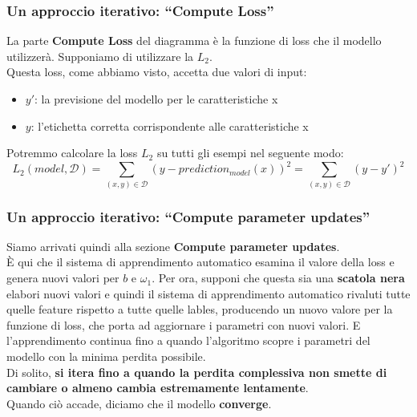 \begin{frame}

	\frametitle{Un approccio iterativo: {\color{GradientDescentDiagramRed}``Compute Loss''}}

		La parte \textbf{Compute Loss} del diagramma è la funzione di loss che il modello utilizzerà.
		\newlinedouble
		Supponiamo di utilizzare la $L_2$.\\
		Questa loss, come abbiamo visto, accetta due valori di input:
		\begin{itemize}
			\item $y'$: la previsione del modello per le caratteristiche x
			\item $y$: l'etichetta corretta corrispondente alle caratteristiche x
		\end{itemize}

		\vspace{4mm}
		Potremmo calcolare la loss $L_2$ su tutti gli esempi nel seguente modo:
		$$L_2(model, \mathcal{D}) = \sum_{(x,y)\in\mathcal{D}} \left( y-prediction_{model}(x) \right)^2 = \sum_{(x,y)\in\mathcal{D}}(y-y')^2$$


\end{frame}


\begin{frame}

	\frametitle{Un approccio iterativo: {\color{GradientDescentDiagramGreen}``Compute parameter updates''}}


		Siamo arrivati quindi alla sezione \textbf{Compute parameter updates}.\\
		È qui che il sistema di apprendimento automatico esamina il valore della loss e genera nuovi valori per $b$ e $\omega_1$.
		\newlinedouble
		Per ora, supponi che questa sia una \textbf{scatola nera} elabori nuovi valori e quindi il sistema di apprendimento automatico rivaluti tutte quelle feature rispetto a tutte quelle lables, producendo un nuovo valore per la funzione di loss, che porta ad aggiornare i parametri con nuovi valori.
		\newlinedouble
		E l'apprendimento continua fino a quando l'algoritmo scopre i parametri del modello con la minima perdita possibile.\\
		Di solito, \textbf{si itera fino a quando la perdita complessiva non smette di cambiare o almeno cambia estremamente lentamente}.\\
		Quando ciò accade, diciamo che il modello \textbf{converge}.


\end{frame}


